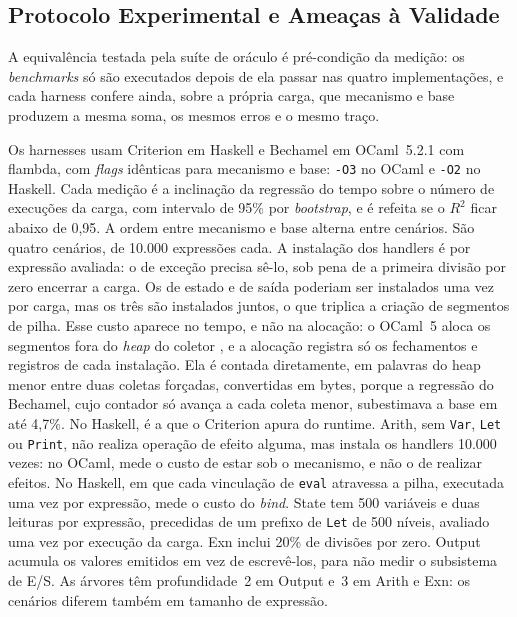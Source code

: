 \documentclass[12pt]{article}
\newcommand{\ViesAlocMax}{4,7}
\begin{document}
\subsection{Protocolo Experimental e Ameaças à Validade}\label{sec:protocolo}

A equivalência testada
pela suíte de oráculo é pré-condição da medição: os
\textit{benchmarks} só são executados depois de ela passar nas quatro
implementações, e cada harness confere ainda, sobre a própria carga,
que mecanismo e base produzem a mesma soma, os mesmos erros e o mesmo traço.

Os harnesses usam Criterion \cite{criterion:08} em Haskell e
Bechamel \cite{bechamel:21} em OCaml~5.2.1 com flambda, com
\textit{flags} idênticas para mecanismo e base: \texttt{-O3} no OCaml e
\texttt{-O2} no Haskell. Cada medição é a inclinação da regressão do tempo
sobre o número de execuções da carga, com intervalo de 95\% por
\textit{bootstrap}, e é refeita se o $R^2$ ficar abaixo de 0,95. A ordem entre
mecanismo e base alterna entre cenários. São quatro cenários, de 10.000
expressões cada. A instalação dos handlers é por expressão avaliada:
o de exceção precisa sê-lo, sob pena de a primeira divisão por zero encerrar a
carga. Os de estado e de saída poderiam ser instalados uma vez por carga, mas
os três são instalados juntos, o que triplica a criação de segmentos de
pilha. Esse custo aparece no tempo, e não na alocação: o OCaml~5
aloca os segmentos fora do \textit{heap} do coletor \cite{sivaramakrishnan:21},
e a alocação registra só os fechamentos e registros de cada instalação. Ela é
contada diretamente, em palavras do heap menor entre duas coletas
forçadas, convertidas em bytes, porque a regressão do Bechamel, cujo contador
só avança a cada coleta menor, subestimava a base em até
\ViesAlocMax\%. %
No Haskell, é a que o Criterion apura do runtime. Arith,
sem \texttt{Var},
\texttt{Let} ou \texttt{Print}, não realiza operação de efeito alguma, mas
instala os handlers 10.000 vezes: no OCaml, mede o custo de
estar sob o mecanismo, e não o de realizar efeitos. No Haskell, em que
cada vinculação de \texttt{eval} atravessa a pilha, executada uma vez por
expressão, mede o custo do \textit{bind}. State tem
500 variáveis e duas leituras por expressão, precedidas de um prefixo de
\texttt{Let} de 500 níveis, avaliado uma vez por execução da carga.
Exn inclui 20\% de divisões por zero. Output acumula os
valores emitidos em vez de escrevê-los, para não medir o subsistema de E/S. As
árvores têm profundidade~2 em Output e~3 em Arith e
Exn: os cenários diferem também em tamanho de expressão.
\end{document}
